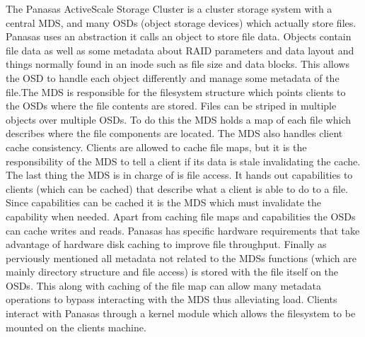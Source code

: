 The Panasas ActiveScale Storage Cluster \cite{Nagle2004} is a cluster storage
system with a central MDS, and many OSDs (object storage devices) which
actually store files. Panasas uses an abstraction it calls an object to store
file data. Objects contain file data as well as some metadata about RAID
parameters and data layout and things normally found in an inode such as file
size and data blocks. This allows the OSD to handle each object differently
and manage some metadata of the file.The MDS is responsible for the filesystem
structure which points clients to the OSDs where the file contents are stored.
Files can be striped in multiple objects over multiple OSDs. To do this the
MDS holds a map of each file which describes where the file components are
located. The MDS also handles client cache consistency. Clients are allowed to
cache file maps, but it is the responsibility of the MDS to tell a client if
its data is stale invalidating the cache. The last thing the MDS is in charge
of is file access. It hands out capabilities to clients (which can be cached)
that describe what a client is able to do to a file. Since capabilities can be
cached it is the MDS which must invalidate the capability when needed. Apart
from caching file maps and capabilities the OSDs can cache writes and reads.
Panasas has specific hardware requirements that take advantage of hardware
disk caching to improve file throughput. Finally as perviously mentioned all
metadata not related to the MDSs functions (which are mainly directory
structure and file access) is stored with the file itself on the OSDs. This
along with caching of the file map can allow many metadata operations to
bypass interacting with the MDS thus alleviating load. Clients interact with
Panasas through a kernel module which allows the filesystem to be mounted on
the clients machine.



